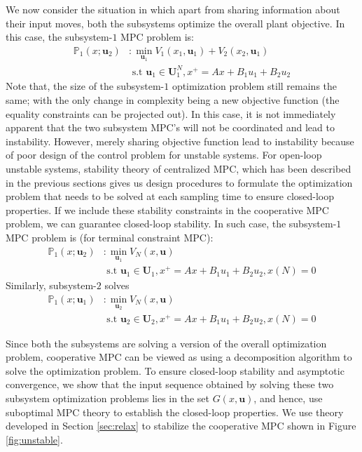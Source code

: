 \documentclass[10pt, twocolumn]{article}
\newcommand{\bu}{\mathbf{u}}
\theoremstyle{definition}
\begin{document}
We now consider the situation in which apart from sharing information about their input moves, both the subsystems optimize the overall plant objective. In this case, the subsystem-$1$ MPC problem is:
\begin{align*} \mathbb{P}_1(x;\bu_2)&: \min_{\bu_1} {V_1(x_1,\bu_1)+V_2(x_2,\bu_1)}\\& \text{~s.t~} \bu_1 \in \mathbf{U}_1^N, x^+= Ax+B_{1}u_1+B_{2}u_2\end{align*}
Note that, the size of the subsystem-$1$ optimization problem still remains the same; with the only change in complexity being a new objective function (the equality constraints can be projected out). In this case, it is not immediately apparent that the two subsystem MPC's will not be coordinated and lead to instability. However, merely sharing objective function lead to instability because of poor design of the control problem for unstable systems. For open-loop unstable systems, stability theory of centralized MPC, which has been described in the previous sections gives us design procedures to formulate the optimization problem that needs to be solved at each sampling time to ensure closed-loop properties. If we include these stability constraints in the cooperative MPC problem, we can guarantee closed-loop stability. In such case, the subsystem-$1$ MPC problem is (for terminal constraint MPC):
\begin{align*} \mathbb{P}_1(x;\bu_2)&: \min_{\bu_1}{V_N(x,\bu)} \\&\text{~s.t~}  \bu_1 \in \mathbf{U}_1, x^+=Ax+B_{1}u_1+B_{2}u_2, x(N) = 0 \end{align*}
Similarly, subsystem-$2$ solves
\begin{align*} \mathbb{P}_1(x;\bu_1)&: \min_{\bu_2}{V_N(x,\bu)}\\& \text{~s.t~}  \bu_2 \in \mathbf{U}_2, x^+=Ax+B_{1}u_1+B_{2}u_2, x(N) = 0 \end{align*}

Since both the subsystems are solving a version of the overall optimization problem, cooperative MPC can be viewed as using a decomposition algorithm to solve the optimization problem. To ensure closed-loop stability and asymptotic convergence, we show that the input sequence obtained by solving these two subsystem optimization problems lies in the set $G(x,\bu)$, and hence, use suboptimal MPC theory to establish the closed-loop properties. We use theory developed in Section \ref{sec:relax} to stabilize the cooperative MPC shown in Figure \ref{fig:unstable}.
\end{document}
